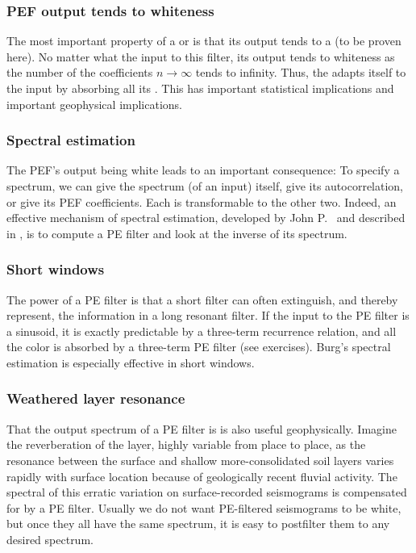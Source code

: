 \subsubsection{PEF output tends to whiteness}
The most important property of a 
or  is that
its output tends to a  (to be proven here).
No matter what the input to this filter,
its output tends to whiteness as the number of the coefficients
$n \rightarrow \infty$ tends to infinity.
Thus, the  adapts itself to the input
by absorbing all its .
This has important statistical implications and
important geophysical implications.

\subsubsection{Spectral estimation}
\par
The PEF's output being white leads to an important consequence:
To specify a spectrum,
we can give the spectrum (of an input) itself,
give its autocorrelation,
or give its PEF coefficients.
Each is transformable to the other two.
Indeed, an effective mechanism of spectral estimation,
developed by John P.~ and described
in ,
is to compute a PE filter and look at the inverse of its spectrum.

\subsubsection{Short windows}
\par
The power of a PE filter is that a short filter can often extinguish,
and thereby represent, the information in a long resonant filter.
If the input to the PE filter is a sinusoid,
it is exactly predictable by a three-term recurrence relation,
and all the color is absorbed by a three-term PE filter (see exercises).
Burg's spectral estimation is especially effective in short windows.

\subsubsection{Weathered layer resonance}
\par
That the output spectrum of a PE filter is  is also
useful geophysically.
Imagine the reverberation of the  layer,
highly variable from place to place,
as the resonance between the surface and shallow
more-consolidated soil layers
varies rapidly with surface location
because
of geologically recent fluvial activity.
The spectral  of this erratic variation on surface-recorded
seismograms is compensated for by a PE filter.
Usually we do not want PE-filtered seismograms to be white,
but once they all have the same spectrum,
it is easy to postfilter them to any desired spectrum.





